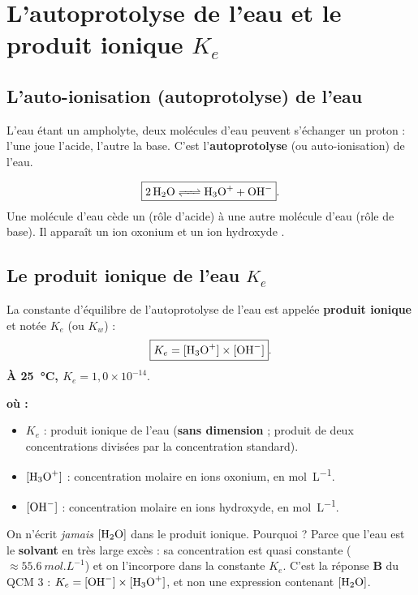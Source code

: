 \documentclass[11pt,a4paper]{article}
\newenvironment{ou}{%
  \par\smallskip\noindent\textbf{où :}\nopagebreak
  \begin{itemize}[leftmargin=1.8em,topsep=2pt,itemsep=1.5pt,parsep=0pt]}%
  {\end{itemize}}
\begin{document}
\section{L'autoprotolyse de l'eau et le produit ionique $K_e$}

\subsection{L'auto-ionisation (autoprotolyse) de l'eau}

L'eau étant un ampholyte, deux molécules d'eau peuvent s'échanger un proton : l'une joue l'acide, l'autre la
base. C'est l'\textbf{autoprotolyse} (ou auto-ionisation) de l'eau.

\begin{regle}
\[ \boxed{\ce{2 H2O <=> H3O+ + OH-}}. \]
Une molécule d'eau cède un  (rôle d'acide) à une autre molécule d'eau (rôle de base). Il apparaît un
ion oxonium  et un ion hydroxyde .
\end{regle}

\subsection{Le produit ionique de l'eau $K_e$}

\begin{formule}
La constante d'équilibre de l'autoprotolyse de l'eau est appelée \textbf{produit ionique} et notée $K_e$ (ou
$K_w$) :
\[ \boxed{K_e = [\ce{H3O+}] \times [\ce{OH-}]}. \]
\textbf{À \SI{25}{\celsius}, $K_e = 1{,}0 \times 10^{-14}$}.
\end{formule}

\begin{ou}
\item $K_e$ : produit ionique de l'eau (\textbf{sans dimension} ; produit de deux concentrations divisées par
      la concentration standard).
\item $[\ce{H3O+}]$ : concentration molaire en ions oxonium, en \si{mol.L^{-1}}.
\item $[\ce{OH-}]$ : concentration molaire en ions hydroxyde, en \si{mol.L^{-1}}.
\end{ou}

\begin{attention}
On n'écrit \emph{jamais} $[\ce{H2O}]$ dans le produit ionique. Pourquoi ? Parce que l'eau est le
\textbf{solvant} en très large excès : sa concentration est quasi constante ($\approx \SI{55,6}{mol.L^{-1}}$)
et on l'incorpore dans la constante $K_e$. C'est la réponse \textbf{B} du QCM 3 :
$K_e = [\ce{OH-}]\times[\ce{H3O+}]$, et non une expression contenant $[\ce{H2O}]$.
\end{attention}
\end{document}
